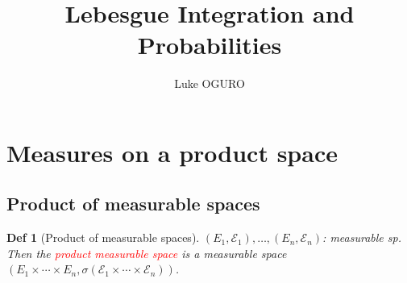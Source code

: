 \documentclass{article}
\newcommand{\red}[1]{\textcolor{red}{#1}}
\theoremstyle{mystyle}
\newtheorem{dfn}{Def}[section]
\begin{document}
\title{Lebesgue Integration and Probabilities}
\author{Luke OGURO}
\maketitle

\tableofcontents

\section{Measures on a product space}
\subsection{Product of measurable spaces}
\begin{dfn}[Product of measurable spaces]
  $(E_1, \mathcal{E}_1), \dots, (E_n, \mathcal{E}_n)$: measurable sp.\\
  Then the \red{product measurable space} is a measurable space 
  $(E_1 \times \cdots \times E_n, \sigma(\mathcal{E}_1 \times \cdots \times \mathcal{E}_n))$.
\end{dfn}



\end{document}
